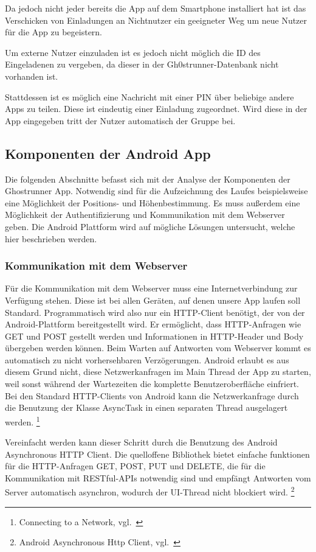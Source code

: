 Da jedoch nicht jeder bereits die App auf dem Smartphone installiert hat ist das Verschicken von Einladungen an Nichtnutzer ein geeigneter Weg um neue Nutzer für die App zu begeistern.

Um externe Nutzer einzuladen ist es jedoch nicht möglich die ID des Eingeladenen zu vergeben, da dieser in der Gh0strunner-Datenbank nicht vorhanden ist.

Stattdessen ist es möglich eine Nachricht mit einer PIN über beliebige andere Apps zu teilen. Diese ist eindeutig einer Einladung zugeordnet. Wird diese in der App eingegeben tritt der Nutzer automatisch der Gruppe bei.
\subsection{Komponenten der Android App}
Die folgenden Abschnitte befasst sich mit der Analyse der Komponenten der Ghostrunner App. Notwendig sind für die Aufzeichnung des Laufes beispielsweise eine Möglichkeit der Positions- und Höhenbestimmung. Es muss außerdem eine Möglichkeit der Authentifizierung und Kommunikation mit dem Webserver geben. Die Android Plattform wird auf mögliche Lösungen untersucht, welche hier beschrieben werden.
\subsubsection{Kommunikation mit dem Webserver}
Für die Kommunikation mit dem Webserver muss eine Internetverbindung zur Verfügung stehen. Diese ist bei allen Geräten, auf denen unsere App laufen soll Standard. Programmatisch wird also nur ein HTTP-Client benötigt, der von der Android-Plattform bereitgestellt wird. Er ermöglicht, dass  HTTP-Anfragen wie GET und POST gestellt werden und Informationen in HTTP-Header und Body übergeben werden können. Beim Warten auf Antworten vom Webserver kommt es automatisch zu nicht vorhersehbaren Verzögerungen. Android erlaubt es aus diesem Grund nicht, diese Netzwerkanfragen im Main Thread der App zu starten, weil sonst während der Wartezeiten die komplette Benutzeroberfläche einfriert. Bei den Standard HTTP-Clients von Android kann die Netzwerkanfrage durch die Benutzung der Klasse AsyncTask in einen separaten Thread ausgelagert werden. \footnote{Connecting to a Network, vgl.~\cite{androidnetwork}}

Vereinfacht werden kann dieser Schritt durch die Benutzung des Android Asynchronous HTTP Client. Die quelloffene Bibliothek bietet einfache funktionen für die HTTP-Anfragen GET, POST, PUT und DELETE, die für die Kommunikation mit RESTful-APIs notwendig sind und empfängt Antworten vom Server automatisch asynchron, wodurch der UI-Thread nicht blockiert wird. \footnote{Android Asynchronous Http Client, vgl.~\cite{loopj}}
